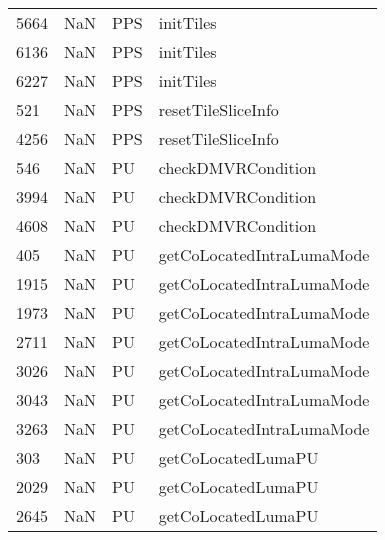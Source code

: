 \begin{tabular}{llll}
5664 &                   NaN &                        PPS &                                 initTiles \\
6136 &                   NaN &                        PPS &                                 initTiles \\
6227 &                   NaN &                        PPS &                                 initTiles \\
521  &                   NaN &                        PPS &                        resetTileSliceInfo \\
4256 &                   NaN &                        PPS &                        resetTileSliceInfo \\
546  &                   NaN &                         PU &                        checkDMVRCondition \\
3994 &                   NaN &                         PU &                        checkDMVRCondition \\
4608 &                   NaN &                         PU &                        checkDMVRCondition \\
405  &                   NaN &                         PU &                 getCoLocatedIntraLumaMode \\
1915 &                   NaN &                         PU &                 getCoLocatedIntraLumaMode \\
1973 &                   NaN &                         PU &                 getCoLocatedIntraLumaMode \\
2711 &                   NaN &                         PU &                 getCoLocatedIntraLumaMode \\
3026 &                   NaN &                         PU &                 getCoLocatedIntraLumaMode \\
3043 &                   NaN &                         PU &                 getCoLocatedIntraLumaMode \\
3263 &                   NaN &                         PU &                 getCoLocatedIntraLumaMode \\
303  &                   NaN &                         PU &                        getCoLocatedLumaPU \\
2029 &                   NaN &                         PU &                        getCoLocatedLumaPU \\
2645 &                   NaN &                         PU &                        getCoLocatedLumaPU \\

\end{tabular}

